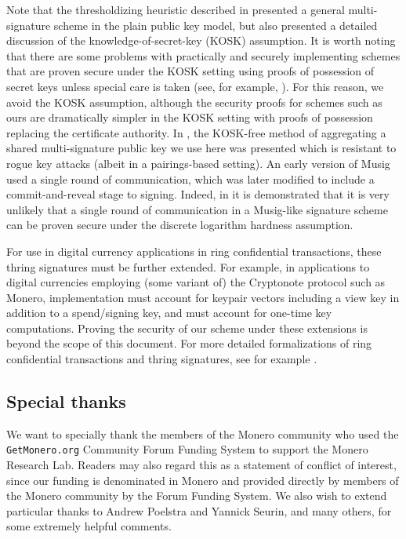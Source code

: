 \documentclass{mrl}
\theoremstyle{definition}
\numberwithin{theorem}{subsection}
\begin{document}
Note that the thresholdizing heuristic described in \cite{bellare2006multi} presented a general multi-signature scheme in the plain public key model, but also presented a detailed discussion of the knowledge-of-secret-key (KOSK) assumption. It is worth noting that there are some problems with practically and securely implementing schemes that are proven secure under the KOSK setting using proofs of possession of secret keys unless special care is taken (see, for example, \cite{ristenpart2007power}). For this reason, we avoid the KOSK assumption, although the security proofs for schemes such as ours are dramatically simpler in the KOSK setting with proofs of possession replacing the certificate authority. In \cite{qian2010non}, the KOSK-free method of aggregating a shared multi-signature public key we use here was presented which is resistant to rogue key attacks (albeit in a pairings-based setting).  An early version of Musig used a single round of communication, which was later modified to include a commit-and-reveal stage to signing. Indeed, in \cite{drijvers2018okamoto} it is demonstrated that it is very unlikely that a single round of communication in a Musig-like signature scheme can be proven secure under the discrete logarithm hardness assumption.  
 



For use in digital currency applications in ring confidential transactions, these thring signatures must be further extended. For example, in applications to digital currencies employing (some variant of) the Cryptonote protocol such as Monero, implementation must account for keypair vectors including a view key in addition to a spend/signing key, and must account for one-time key computations. Proving the security of our scheme under these extensions is beyond the scope of this document. For more detailed formalizations of ring confidential transactions and thring signatures, see for example \cite{ruffct2}.

 



\subsection{Special thanks} 

We want to specially thank the members of the Monero community who used the \texttt{GetMonero.org} Community Forum Funding System to support the Monero Research Lab. Readers may also regard this as a statement of conflict of interest, since our funding is denominated in Monero and provided directly by members of the Monero community by the Forum Funding System. We also wish to extend particular thanks to Andrew Poelstra and Yannick Seurin, and many others, for some extremely helpful comments.
\end{document}
